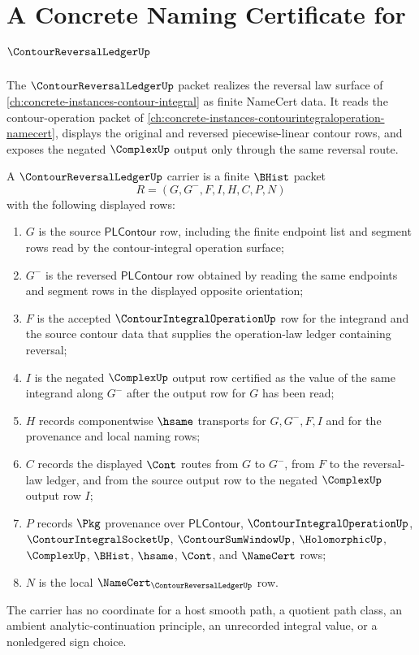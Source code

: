 \chapter{A Concrete Naming Certificate for $\ContourReversalLedgerUp$}
\label{ch:concrete-instances-contour-reversal-ledger-namecert}

The $\ContourReversalLedgerUp$ packet realizes the reversal law surface of \autoref{ch:concrete-instances-contour-integral} as finite NameCert data. It reads the contour-operation packet of \autoref{ch:concrete-instances-contourintegraloperation-namecert}, displays the original and reversed piecewise-linear contour rows, and exposes the negated $\ComplexUp$ output only through the same reversal route.

\begin{definition}
\label{def:contour-reversal-ledger-carrier}
A $\ContourReversalLedgerUp$ carrier is a finite $\BHist$ packet
$$
R=(G,G^{-},F,I,H,C,P,N)
$$
with the following displayed rows:
\begin{enumerate}
\item $G$ is the source $\mathsf{PLContour}$ row, including the finite endpoint list and segment rows read by the contour-integral operation surface;
\item $G^{-}$ is the reversed $\mathsf{PLContour}$ row obtained by reading the same endpoints and segment rows in the displayed opposite orientation;
\item $F$ is the accepted $\ContourIntegralOperationUp$ row for the integrand and the source contour data that supplies the operation-law ledger containing reversal;
\item $I$ is the negated $\ComplexUp$ output row certified as the value of the same integrand along $G^{-}$ after the output row for $G$ has been read;
\item $H$ records componentwise $\hsame$ transports for $G,G^{-},F,I$ and for the provenance and local naming rows;
\item $C$ records the displayed $\Cont$ routes from $G$ to $G^{-}$, from $F$ to the reversal-law ledger, and from the source output row to the negated $\ComplexUp$ output row $I$;
\item $P$ records $\Pkg$ provenance over $\mathsf{PLContour}$, $\ContourIntegralOperationUp$, $\ContourIntegralSocketUp$, $\ContourSumWindowUp$, $\HolomorphicUp$, $\ComplexUp$, $\BHist$, $\hsame$, $\Cont$, and $\NameCert$ rows;
\item $N$ is the local $\NameCert_{\ContourReversalLedgerUp}$ row.
\end{enumerate}
The carrier has no coordinate for a host smooth path, a quotient path class, an ambient analytic-continuation principle, an unrecorded integral value, or a nonledgered sign choice.
\end{definition}


